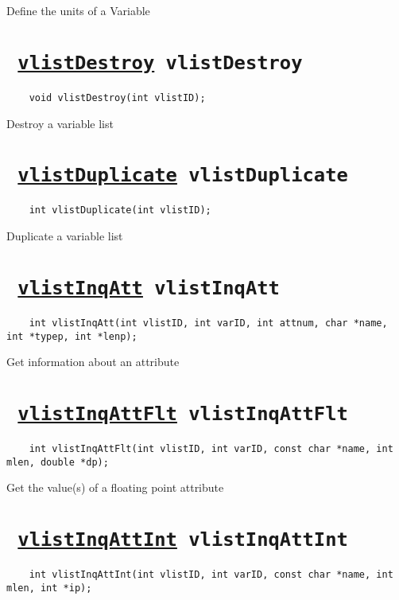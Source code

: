 Define the units of a Variable
\ifpdfoutput{}{(\ref{vlistDefVarUnits})}


\section*{\tt 
\ifpdf
\hyperref[vlistDestroy]{vlistDestroy}
\else
vlistDestroy
\fi
}
\begin{verbatim}
    void vlistDestroy(int vlistID);
\end{verbatim}

Destroy a variable list
\ifpdfoutput{}{(\ref{vlistDestroy})}


\section*{\tt 
\ifpdf
\hyperref[vlistDuplicate]{vlistDuplicate}
\else
vlistDuplicate
\fi
}
\begin{verbatim}
    int vlistDuplicate(int vlistID);
\end{verbatim}

Duplicate a variable list
\ifpdfoutput{}{(\ref{vlistDuplicate})}


\section*{\tt 
\ifpdf
\hyperref[vlistInqAtt]{vlistInqAtt}
\else
vlistInqAtt
\fi
}
\begin{verbatim}
    int vlistInqAtt(int vlistID, int varID, int attnum, char *name, int *typep, int *lenp);
\end{verbatim}

Get information about an attribute
\ifpdfoutput{}{(\ref{vlistInqAtt})}


\section*{\tt 
\ifpdf
\hyperref[vlistInqAttFlt]{vlistInqAttFlt}
\else
vlistInqAttFlt
\fi
}
\begin{verbatim}
    int vlistInqAttFlt(int vlistID, int varID, const char *name, int mlen, double *dp);
\end{verbatim}

Get the value(s) of a floating point attribute
\ifpdfoutput{}{(\ref{vlistInqAttFlt})}


\section*{\tt 
\ifpdf
\hyperref[vlistInqAttInt]{vlistInqAttInt}
\else
vlistInqAttInt
\fi
}
\begin{verbatim}
    int vlistInqAttInt(int vlistID, int varID, const char *name, int mlen, int *ip);
\end{verbatim}

